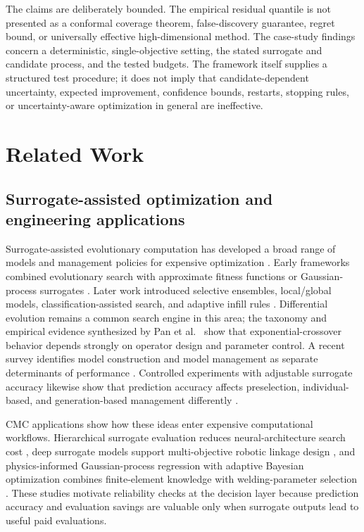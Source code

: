 \documentclass[cmc,article,submit,moreauthors,pdftex]{Definitions/tsp}
\begin{document}
The claims are deliberately bounded. The empirical residual quantile is not presented as a conformal coverage theorem, false-discovery guarantee, regret bound, or universally effective high-dimensional method. The case-study findings concern a deterministic, single-objective setting, the stated surrogate and candidate process, and the tested budgets. The framework itself supplies a structured test procedure; it does not imply that candidate-dependent uncertainty, expected improvement, confidence bounds, restarts, stopping rules, or uncertainty-aware optimization in general are ineffective.

\hypertarget{related-work}{%
\section{Related Work}\label{related-work}}

\hypertarget{surrogate-assisted-optimization-and-engineering-applications}{%
\subsection{Surrogate-assisted optimization and engineering applications}\label{surrogate-assisted-optimization-and-engineering-applications}}

Surrogate-assisted evolutionary computation has developed a broad range of models and management policies for expensive optimization \cite{ref-1,ref-2}. Early frameworks combined evolutionary search with approximate fitness functions or Gaussian-process surrogates \cite{ref-3,ref-16}. Later work introduced selective ensembles, local/global models, classification-assisted search, and adaptive infill rules \cite{ref-4,ref-5,ref-17,ref-18,ref-19}. Differential evolution remains a common search engine in this area; the taxonomy and empirical evidence synthesized by Pan et al.~\cite{ref-31} show that exponential-crossover behavior depends strongly on operator design and parameter control. A recent survey identifies model construction and model management as separate determinants of performance \cite{ref-2}. Controlled experiments with adjustable surrogate accuracy likewise show that prediction accuracy affects preselection, individual-based, and generation-based management differently \cite{ref-20}.

CMC applications show how these ideas enter expensive computational workflows. Hierarchical surrogate evaluation reduces neural-architecture search cost \cite{ref-27}, deep surrogate models support multi-objective robotic linkage design \cite{ref-28}, and physics-informed Gaussian-process regression with adaptive Bayesian optimization combines finite-element knowledge with welding-parameter selection \cite{ref-29}. These studies motivate reliability checks at the decision layer because prediction accuracy and evaluation savings are valuable only when surrogate outputs lead to useful paid evaluations.
\end{document}
